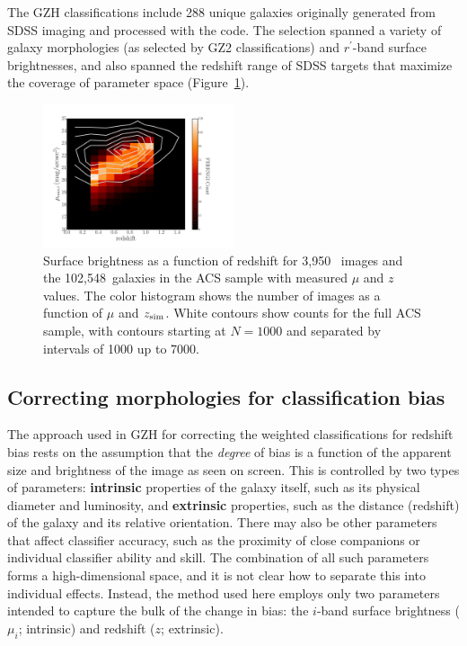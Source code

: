 \documentclass[twocolumn]{aastex6}
\begin{document}
The GZH classifications include 288 unique galaxies originally generated from
SDSS imaging and processed with the \ferengi{} code. The selection spanned a
variety of galaxy morphologies (as selected by GZ2 classifications) and
$r^\prime$-band surface brightnesses, and also spanned the redshift range of
SDSS targets that maximize the coverage of parameter space
(Figure~\ref{fig:sb_redshift}). 

\begin{figure}
\begin{center}
\includegraphics[width=0.5\textwidth]{figures/eye_of_sauron.pdf}
\caption{Surface brightness as a function of redshift for 3,950~\ferengi{}
images and the 102,548~galaxies in the ACS sample with measured $\mu$ and $z$
values. The color histogram shows the number of \ferengi{} images as a function
of $\mu$ and $z_{\rm sim}$. White contours show counts for the full ACS sample,
with contours starting at $N=1000$ and separated by intervals of 1000 up to
7000.} 
\label{fig:sb_redshift}
\end{center}
\end{figure}

\subsection{Correcting morphologies for classification bias}\label{ssec:zeta}

The approach used in GZH for correcting the weighted classifications for
redshift bias rests on the assumption that the \emph{degree} of bias is a
function of the apparent size and brightness of the image as seen on screen.
This is controlled by two types of parameters: \textbf{intrinsic} properties of
the galaxy itself, such as its physical diameter and luminosity, and
\textbf{extrinsic} properties, such as the distance (redshift) of the galaxy
and its relative orientation. There may also be other parameters that affect
classifier accuracy, such as the proximity of close companions or 
individual classifier ability and skill. The combination of all
such parameters forms a high-dimensional space, and it is not clear how to
separate this into individual effects. Instead, the method used here employs
only two parameters intended to capture the bulk of the change in bias: the
$i$-band surface brightness ($\mu_i$; intrinsic) and redshift ($z$;
extrinsic). 
\end{document}
